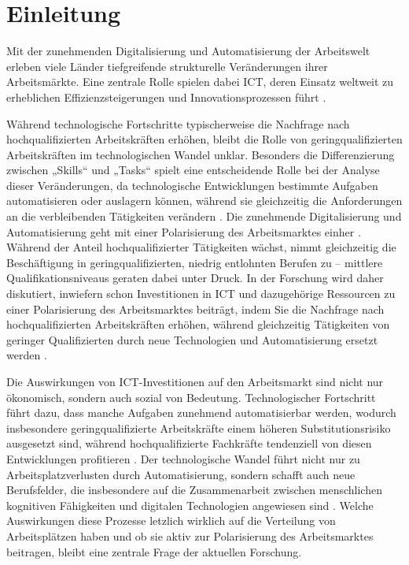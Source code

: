
\section{Einleitung}

Mit der zunehmenden Digitalisierung und Automatisierung der Arbeitswelt erleben viele Länder 
tiefgreifende strukturelle Veränderungen ihrer Arbeitsmärkte. Eine zentrale Rolle spielen dabei 
\ac{ICT}, deren Einsatz weltweit zu erheblichen Effizienzsteigerungen und Innovationsprozessen 
führt \parencite[vgl.][S. 49]{oecd2019measuring}.

Während technologische Fortschritte typischerweise die Nachfrage nach hochqualifizierten 
Arbeitskräften erhöhen, bleibt die Rolle von geringqualifizierten Arbeitskräften im 
technologischen Wandel unklar. Besonders die Differenzierung zwischen „Skills“ und „Tasks“ spielt 
eine entscheidende Rolle bei der Analyse dieser Veränderungen, da technologische Entwicklungen 
bestimmte Aufgaben automatisieren oder auslagern können, während sie gleichzeitig die 
Anforderungen an die verbleibenden Tätigkeiten verändern 
\parencite[vgl.][S. 1045]{acemoglu2011skills}. Die zunehmende Digitalisierung und Automatisierung 
geht mit einer Polarisierung des Arbeitsmarktes einher 
\parencite[vgl.][S. 1070]{acemoglu2011skills}. Während der Anteil hochqualifizierter Tätigkeiten 
wächst, nimmt gleichzeitig die Beschäftigung in geringqualifizierten, niedrig entlohnten Berufen 
zu – mittlere Qualifikationsniveaus geraten dabei unter Druck. In der Forschung wird daher 
diskutiert, inwiefern schon Investitionen in \ac{ICT} und dazugehörige Ressourcen zu einer 
Polarisierung des Arbeitsmarktes beiträgt, indem Sie die Nachfrage nach hochqualifizierten 
Arbeitskräften erhöhen, während gleichzeitig Tätigkeiten von geringer Qualifizierten durch neue 
Technologien und Automatisierung ersetzt werden \parencite[vgl.][S. 2–4]{balsmeier2019isthis}. 

Die Auswirkungen von \ac{ICT}-Investitionen auf den Arbeitsmarkt sind nicht nur ökonomisch, 
sondern auch sozial von Bedeutung. Technologischer Fortschritt führt dazu, dass manche Aufgaben 
zunehmend automatisierbar werden, wodurch insbesondere geringqualifizierte Arbeitskräfte einem 
höheren Substitutionsrisiko ausgesetzt sind, während hochqualifizierte Fachkräfte tendenziell von 
diesen Entwicklungen profitieren \parencite[vgl.][S. 1073]{acemoglu2011skills}. Der 
technologische Wandel führt nicht nur zu Arbeitsplatzverlusten durch Automatisierung, sondern 
schafft auch neue Berufsfelder, die insbesondere auf die Zusammenarbeit zwischen menschlichen 
kognitiven Fähigkeiten und digitalen Technologien angewiesen sind 
\parencite[vgl.][S. 210–214]{brynjolfsson2014thesecond}. Welche Auswirkungen diese Prozesse 
letzlich wirklich auf die Verteilung von Arbeitsplätzen haben und ob sie aktiv zur Polarisierung 
des Arbeitsmarktes beitragen, bleibt eine zentrale Frage der aktuellen Forschung. 

